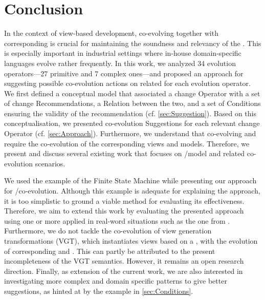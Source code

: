 \section{Conclusion} \label{sec:Conclusion}

In the context of view-based development, co-evolving \viewtypes together with corresponding \metamodels is crucial for maintaining the soundness and relevancy of the \viewtypes. This is especially important in industrial settings where in-house domain-specific languages evolve rather frequently. In this work, we 
analyzed 34 \metamodel evolution operators---27 primitive and 7 complex ones---and proposed an approach for suggesting possible co-evolution actions on related \viewtypes for each \metamodel evolution operator. We first defined a conceptual model that associated a \metamodel change \textsf{Operator} with a set of \viewtype change \textsf{Recommendation}s, a \textsf{Relation} between the two, and a set of \textsf{Conditions}
ensuring the validity of the recommendation (cf. \cref{sec:Suggestion}). Based on this conceptualisation, we presented \viewtype co-evolution \textsf{Suggestion}s for each relevant \metamodel change \textsf{Operator} (cf. \cref{sec:Approach}). Furthermore, we understand that co-evolving \viewtypes and \metamodels require the co-evolution of the corresponding views and models. Therefore, we present and discuss several existing work that focuses on \metamodel/model and related co-evolution scenarios. 

We used the example of the Finite State Machine while presenting our approach for \viewtype/\metamodel co-evolution. Although this example is adequate for explaining the approach, it is too simplistic to ground a viable method for evaluating its effectiveness.
Therefore, we aim to extend this work by evaluating the presented approach using one or more \metamodels applied in real-word situations such as the one from \textcite{braun_classification_2014}. Furthermore, we do not tackle the co-evolution of view generation transformations (VGT), which instantiates views based on a \viewtype, with the evolution of corresponding \viewtypes and \metamodels. This can partly be attributed to the present incompleteness of the VGT semantics. However, it remains an open research direction. Finally, as extension of the current work, we are also interested in investigating more complex and domain specific patterns to give better suggestions, as hinted at by the example in \cref{sec:Conditions}.

